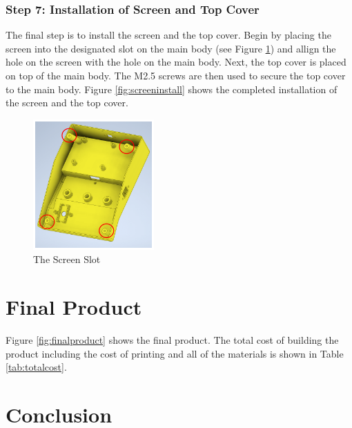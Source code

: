 
\subsubsection{Step 7: Installation of Screen and Top Cover}

The final step is to install the screen and the top cover. Begin by placing the screen into the designated slot on the main body (see Figure \ref{fig:screenslot}) and allign the hole on the screen with the hole on the main body. Next, the top cover is placed on top of the main body. The M2.5 screws are then used to secure the top cover to the main body. Figure \ref{fig:screeninstall} shows the completed installation of the screen and the top cover.

\begin{figure}
    \centering
    \includegraphics[height=5cm]{texs/Part1/chapter5/image/screenslot.png}
    \caption{The Screen Slot}
    \label{fig:screenslot}
\end{figure}


\section{Final Product}
\label{sec:finalproduct}

Figure \ref{fig:finalproduct} shows the final product. The total cost of building the product including the cost of printing and all of the materials is shown in Table \ref{tab:totalcost}.


\section{Conclusion}